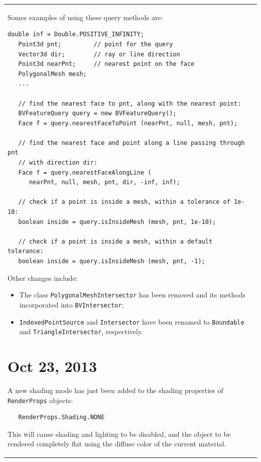 \documentclass{article}
\begin{document}
\begin{tabular}{ll}
Somes examples of using these query methods are:

\begin{lstlisting}[]
   double inf = Double.POSITIVE_INFINITY;
   Point3d pnt;         // point for the query
   Vector3d dir;        // ray or line direction
   Point3d nearPnt;     // nearest point on the face
   PolygonalMesh mesh;
   ...

   // find the nearest face to pnt, along with the nearest point:
   BVFeatureQuery query = new BVFeatureQuery(); 
   Face f = query.nearestFaceToPoint (nearPnt, null, mesh, pnt);

   // find the nearest face and point along a line passing through pnt
   // with direction dir:
   Face f = query.nearestFaceAlongLine (
      nearPnt, null, mesh, pnt, dir, -inf, inf);

   // check if a point is inside a mesh, within a tolerance of 1e-10:
   boolean inside = query.isInsideMesh (mesh, pnt, 1e-10);

   // check if a point is inside a mesh, within a default tolerance:
   boolean inside = query.isInsideMesh (mesh, pnt, -1);
\end{lstlisting}

Other changes include:

\begin{itemize}

\item The class {\tt PolygonalMeshIntersector} has been removed and
its methods incorporated into {\tt BVIntersector};

\item {\tt IndexedPointSource} and {\tt Intersector} have been renamed
to {\tt Boundable} and {\tt TriangleIntersector}, respectively.

\end{itemize}

\section*{Oct 23, 2013}

A new shading mode has just been added to the shading properties
of {\tt RenderProps} objects:
\begin{verbatim}
   RenderProps.Shading.NONE
\end{verbatim}
This will cause shading and lighting to be disabled, and the
object to be rendered completely flat using the diffuse
color of the current material.


\end{tabular}
\end{document}
